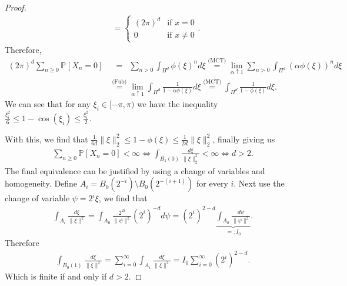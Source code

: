 \begin{proof}
\begin{align}
	&= 
	\begin{cases}
		(2 \pi)^d & \textrm{if }x = 0 \\
		0 & \textrm{if } x \neq 0
	\end{cases}.
\end{align}
Therefore,
\begin{align}
	(2 \pi )^d \sum_{n\geq 0}^{} \mathbb{P}_{} \left[ X_n =0 \right] 
		&\stackrel{\phantom{\textrm{(Fub)}}}{=} \sum_{n> 0}^{} \int_{\Pi^d}^{} \phi(\xi)^n d \xi 
		\stackrel{\textrm{(MCT)}}{=} \lim_{\alpha \uparrow 1} \sum_{n> 0}^{} \int_{\Pi^d}^{} (\alpha \phi(\xi))^n d\xi \\
	& \stackrel{\textrm{(Fub)}}{=} \lim_{\alpha \uparrow 1} \int_{\Pi^d}^{}  \frac{1}{1-\alpha \phi(\xi)} d \xi 
		\stackrel{\textrm{(MCT)}}{=} \int_{\Pi^d}^{} \frac{1}{1-\phi(\xi)} d \xi
.\end{align}
We can see that for any $\xi_i \in [-\pi, \pi )$ we have the inequality $\frac{\xi_i^2}{6} \leq 1 - \cos(\xi_i) \leq \frac{\xi_i^2}{2}$. 

With this, we find that $\frac{1}{6d}\| \xi \|_2^2 \leq 1 - \phi(\xi) \leq \frac{1}{2d} \| \xi \|_2^2$, finally giving us
\begin{align}
	\sum_{n\geq 0}^{} \mathbb{P}_{} \left[  X_n = 0\right] < \infty \iff \int_{B_1(0)}^{} \frac{d\xi}{\| \xi \|_2^2} < \infty \iff d>2.
\end{align}
The final equivalence can be justified by using a change of variables and homogeneity. Define $A_i = B_0(2^{-i}) \setminus B_0(2^{-(i+1)})$ for every $i$. Next use the change of variable $\psi = 2^{i}\xi$, we find that
\begin{align}
	\int_{A_i}^{} \frac{d\xi}{\| \xi \|^2} = \int_{A_0}^{} \frac{2^{2i}}{\| \psi \|^2} (2^{i})^{-d} d\psi
	= (2^{i})^{2-d} \underbrace{ \int_{A_0}\frac{d\psi}{\| \psi\|^2}}_{=: I_0}.
\end{align}
Therefore 
\begin{align}
	\int_{B_0(1)}^{} \frac{d \xi}{\| \xi \|^2} = \sum_{i=0}^{\infty} \int_{A_i}^{} \frac{d\xi}{\| \xi\| ^2} = I_0 \sum_{i=0}^{\infty} (2^i)^{2-d}.
\end{align}
Which is finite if and only if $d>2$.
\end{proof}

